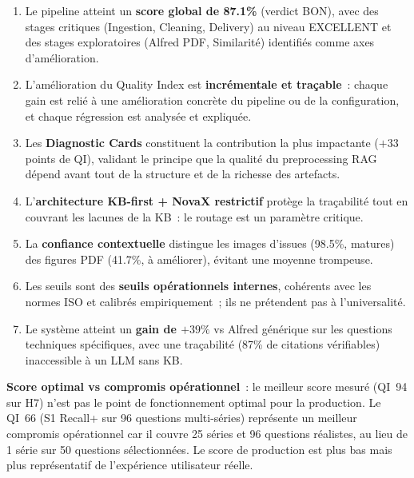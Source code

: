 \begin{enumerate}
  \item Le pipeline atteint un \textbf{score global de 87.1\%} (verdict BON), avec des stages critiques (Ingestion, Cleaning, Delivery) au niveau EXCELLENT et des stages exploratoires (Alfred PDF, Similarité) identifiés comme axes d'amélioration.
  
  \item L'amélioration du Quality Index est \textbf{incrémentale et traçable}~: chaque gain est relié à une amélioration concrète du pipeline ou de la configuration, et chaque régression est analysée et expliquée.
  
  \item Les \textbf{Diagnostic Cards} constituent la contribution la plus impactante ($+33$ points de QI), validant le principe que la qualité du preprocessing RAG dépend avant tout de la structure et de la richesse des artefacts.
  
  \item L'\textbf{architecture KB-first + NovaX restrictif} protège la traçabilité tout en couvrant les lacunes de la KB~: le routage est un paramètre critique.
  
  \item La \textbf{confiance contextuelle} distingue les images d'issues (98.5\%, matures) des figures PDF (41.7\%, à améliorer), évitant une moyenne trompeuse.
  
  \item Les seuils sont des \textbf{seuils opérationnels internes}, cohérents avec les normes ISO et calibrés empiriquement~; ils ne prétendent pas à l'universalité.
  
  \item Le système atteint un \textbf{gain de $+39\%$} vs Alfred générique sur les questions techniques spécifiques, avec une traçabilité (87\% de citations vérifiables) inaccessible à un LLM sans KB.
\end{enumerate}

\textbf{Score optimal vs compromis opérationnel}~: le meilleur score mesuré (QI~94 sur H7) n'est pas le point de fonctionnement optimal pour la production. Le QI~66 (S1 Recall+ sur 96 questions multi-séries) représente un meilleur compromis opérationnel car il couvre 25 séries et 96 questions réalistes, au lieu de 1 série sur 50 questions sélectionnées. Le score de production est plus bas mais plus représentatif de l'expérience utilisateur réelle.
